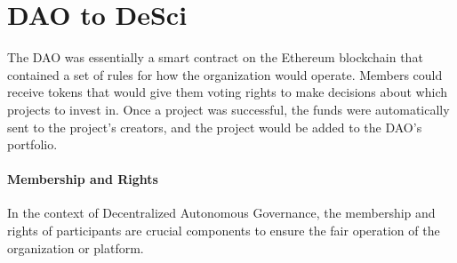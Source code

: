 \documentclass[lettersize,journal]{IEEEtran}
\begin{document}
  

\section{DAO to DeSci}

The DAO was essentially a smart contract on the Ethereum blockchain that contained a set of rules for how the organization would operate. Members could receive tokens that would give them voting rights to make decisions about which projects to invest in. Once a project was successful, the funds were automatically sent to the project's creators, and the project would be added to the DAO's portfolio.


\paragraph{Membership and Rights}
In the context of Decentralized Autonomous Governance, the membership and rights of participants are crucial components to ensure the fair operation of the organization or platform. 
\end{document}
